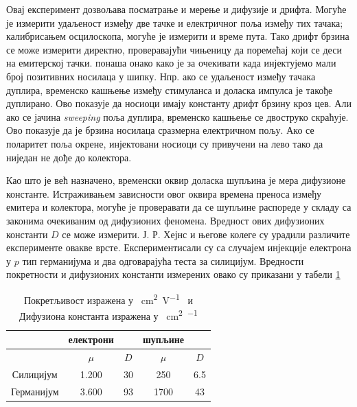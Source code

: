 \documentclass{article}
\begin{document}
Овај експеримент дозвољава посматрање и мерење и дифузије и дрифта. Могуће је измерити удаљеност између две тачке и електричног поља између тих тачака; калибрисањем осцилоскопа, могуће је измерити и време пута. Тако дрифт брзина се може измерити директно, проверавајући чињеницу да поремећај који се деси на емитерској тачки. понаша онако како је за очекивати када инјектујемо мали број позитивних носилаца у шипку. Нпр. ако се удаљеност између тачака дуплира, временско кашњење између стимуланса и доласка импулса је такође дуплирано. Ово показује да носиоци имају константу дрифт брзину кроз цев. Али ако се јачина \textit{sweeping} поља дуплира, временско кашњење се двоструко скраћује. Ово показује да је брзина носилаца сразмерна електричном пољу. Ако се поларитет поља окрене, инјектовани носиоци су привучени на лево тако да ниједан не дође до колектора.

Као што је већ назначено, временски оквир доласка шупљина је мера дифузионе константе. Истраживањем зависности овог оквира времена преноса између емитера и колектора, могуће је проверавати да се шупљине распореде у складу са законима очекиваним од дифузионих феномена. Вредност ових дифузионих константи $D$ се може измерити. Ј. Р. Хејнс и његове колеге су урадили различите експерименте овакве врсте. Експериментисали су са случајем инјекције електрона у $p$ тип германијума и два одговарајућа теста за силицијум. Вредности покретности и дифузионих константи измерених овако су приказани у табели \ref{table:permeability-diffusion-constant}


\begin{table}[ht]
	\centering
	\begin{tabular}{c|cc|cc}
		\hline
		 & електрони & & шупљине &  \\
		\hline
		 & $\mu$ & $D$ & $\mu$ & $D$ \\
		\hline
		Силицијум & 1.200 & 30 & 250 & 6.5\\ 
		\hline
        Германијум & 3.600 & 93 & 1700 & 43\\ 
		\hline
        
	\end{tabular}
	\caption{Покретљивост изражена у \SI{}{\square\cm\per\volt\sec} и Дифузиона константа изражена у \SI{}{\square\cm\per\sec} } 
    \label{table:permeability-diffusion-constant}

\end{table}
\end{document}
